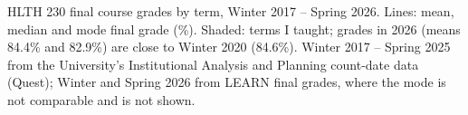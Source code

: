 \begin{center}
\parbox{\linewidth}{\footnotesize HLTH 230 final course grades by term, Winter 2017 -- Spring 2026. Lines: mean, median and mode final grade (\%). Shaded: terms I taught; grades in 2026 (means 84.4\% and 82.9\%) are close to Winter 2020 (84.6\%). Winter 2017 -- Spring 2025 from the University's Institutional Analysis and Planning count-date data (Quest); Winter and Spring 2026 from LEARN final grades, where the mode is not comparable and is not shown.}
\end{center}
